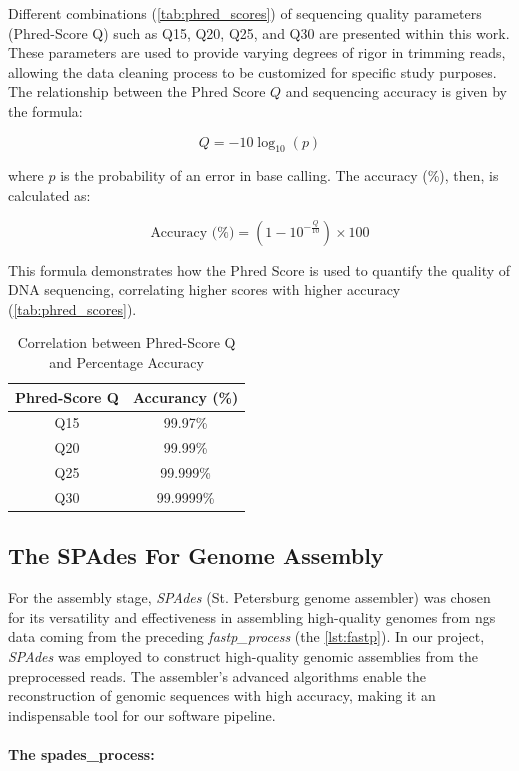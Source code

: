 Different combinations (\autoref{tab:phred_scores}) of \gls{sequencing} quality parameters (Phred-Score Q) such as Q15, Q20, Q25, and Q30 are presented within this work. These parameters are used to provide varying degrees of rigor in \gls{trimming} \gls{read}s, allowing the data cleaning process to be customized for specific study purposes. The relationship between the Phred Score \(Q\) and sequencing accuracy is given by the formula:

\[
Q = -10 \log_{10}(p)
\]

where \(p\) is the probability of an error in base calling. The accuracy (\%), then, is calculated as:

\[
\text{Accuracy (\%)} = (1 - 10^{-\frac{Q}{10}}) \times 100
\]

This formula demonstrates how the Phred Score is used to quantify the quality of DNA sequencing, correlating higher scores with higher accuracy (\autoref{tab:phred_scores}).


\begin{table}[ht]
\centering
\begin{tabular}{cc}
\hline
\textbf{Phred-Score Q} & \textbf{Accurancy (\%)} \\
\hline
Q15 & 99.97\% \\
Q20 & 99.99\% \\
Q25 & 99.999\% \\
Q30 & 99.9999\% \\
\end{tabular}
\caption{Correlation between Phred-Score Q and Percentage Accuracy}
\label{tab:phred_scores}
\end{table}




\subsection{The SPAdes For Genome Assembly}
For the \gls{assembly} stage, \textit{SPAdes} (St. Petersburg genome assembler) was chosen for its versatility and effectiveness in assembling high-quality \gls{genome}s from \gls{ngs} data coming from the preceding \textit{fastp\_process} (the \autoref{lst:fastp}). In our project, \textit{SPAdes} was employed to construct high-quality genomic assemblies from the preprocessed \gls{read}s. The assembler's advanced algorithms enable the reconstruction of genomic sequences with high accuracy, making it an indispensable tool for our software pipeline.

\paragraph{The spades\_process:}


